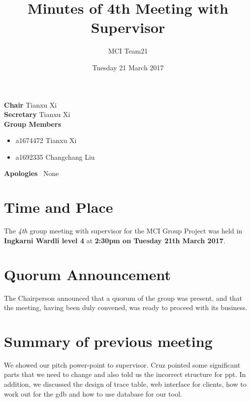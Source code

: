 \documentclass[11pt, a4paper]{article}
\begin{document}
\title{Minutes of 4th Meeting with Supervisor}
\author{MCI Team21}
\date{Tuesday 21 March 2017}
\maketitle

\vspace*{15pt}

\begin{center}
\begin{flushleft}
  \textbf{Chair}      \qquad Tianxu Xi\\
  \textbf{Secretary}   \qquad Tianxu Xi\\
  \textbf{Group Members}
  \begin {itemize}
  		\item a1674472 Tianxu Xi
		\item a1692335 Changchang Liu

  \end{itemize} 
  \textbf{Apologies}  \ None\\
\end{flushleft}
\end{center}




\vspace*{10pt}

\section{Time and Place}
The \emph{4th} group meeting with supervisor for the MCI Group Project was held in \textbf{Ingkarni Wardli level 4} at \textbf{2:30pm on Tuesday 21th March 2017}.
 
\section{Quorum Announcement}
The Chairperson announced that a quorum of the group was present, and that the meeting, having been duly convened, was ready to proceed with its business.

\section{Summary of previous meeting}
We showed our pitch power-point to supervisor. Cruz pointed some significant parts that we need to change and also told us the incorrect structure for ppt. In addition, we discussed the design of trace table, web interface for clients, how to work out for the gdb and how to use database for our tool.
\end{document}
